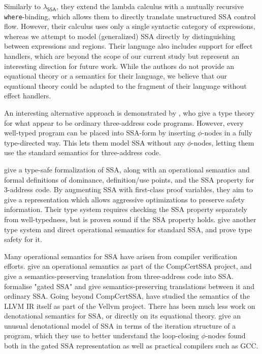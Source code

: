 \documentclass[acmsmall,screen,review]{acmart}
\newcommand{\ms}[1]{\ensuremath{\mathsf{#1}}}
\newcommand{\isotopessa}{\(\lambda_{\ms{SSA}}\)}
\begin{document}
Similarly to \isotopessa{}, they extend the lambda calculus with a mutually recursive
\texttt{where}-binding, which allows them to directly translate unstructured SSA control flow.
However, their calculus uses only a single syntactic category of expressions, whereas we attempt to
model (generalized) SSA directly by distinguishing between expressions and regions. Their language
also includes support for effect handlers, which are beyond the scope of our current study but
represent an interesting direction for future work. While the authors do not provide an equational
theory or a semantics for their language, we believe that our equational theory could be adapted to
the fragment of their language without effect handlers.

An interesting alternative approach is demonstrated by \citet{ssa-types-matsuno-ohori-06}, who give
a type theory for what appear to be ordinary three-address code programs. However, every well-typed
program can be placed into SSA-form by inserting $\phi$-nodes in a fully type-directed way. This
lets them model SSA without any $\phi$-nodes, letting them use the standard semantics for
three-address code. 

\citet{menon-verified-06} give a type-safe formalization of SSA, along with an operational semantics
and  formal definitions of dominance, definition/use points, and the SSA property for 3-address
code. By augmenting SSA with first-class proof variables, they aim to give a representation which
allows aggressive optimizations to preserve safety information. Their type system requires checking
the SSA property separately from well-typedness, but is proven sound if the SSA property holds.
\citet{hua-explicit-ssa-2010} give another type system and direct operational semantics for standard
SSA, and prove type safety for it.

Many operational semantics for SSA have arisen from compiler verification efforts.
\citet{barthe-compcert-ssa-2014} give an operational semantics as part of the CompCertSSA project,
and give a semantics-preserving translation from three-address code into SSA.
\citet{herklotz-gsa-2023} formalise "gated SSA" and give semantics-preserving translations between
it and ordinary SSA. Going beyond CompCertSSA, \citet{vellvm-12} have studied the semantics of the
LLVM IR itself as part of the Vellvm project. There has been much less work on denotational
semantics for SSA, or directly on its equational theory. \citet{pop-ssa-inout-2009} give an unusual
denotational model of SSA in terms of the iteration structure of a program, which they use to better
understand the loop-closing $\phi$-nodes found both in the gated SSA representation as well as
practical compilers such as GCC.
\end{document}
